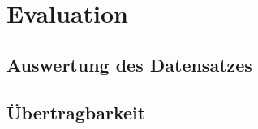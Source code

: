 \chapter{Evaluation}
\label{chapter5}


\section{Auswertung des Datensatzes}
\label{chapter5-AuswertungDatensatz}


\section{Übertragbarkeit}
\label{chapter5-Übertragbarkeit}